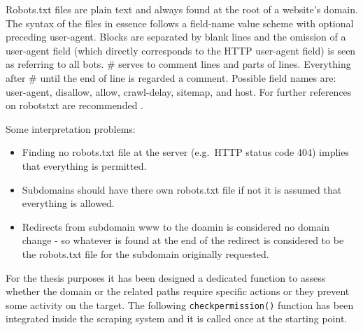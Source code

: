 \documentclass[
  12pt,
  a4paper,
  oneside]{book}
\newenvironment{Shaded}{\begin{snugshade}}{\end{snugshade}}
\newcommand{\CharTok}[1]{\textcolor[rgb]{0.31,0.60,0.02}{#1}}
\newcommand{\CommentTok}[1]{\textcolor[rgb]{0.56,0.35,0.01}{\textit{#1}}}
\newcommand{\ControlFlowTok}[1]{\textcolor[rgb]{0.13,0.29,0.53}{\textbf{#1}}}
\newcommand{\DataTypeTok}[1]{\textcolor[rgb]{0.13,0.29,0.53}{#1}}
\newcommand{\DecValTok}[1]{\textcolor[rgb]{0.00,0.00,0.81}{#1}}
\newcommand{\KeywordTok}[1]{\textcolor[rgb]{0.13,0.29,0.53}{\textbf{#1}}}
\newcommand{\NormalTok}[1]{#1}
\newcommand{\OperatorTok}[1]{\textcolor[rgb]{0.81,0.36,0.00}{\textbf{#1}}}
\newcommand{\StringTok}[1]{\textcolor[rgb]{0.31,0.60,0.02}{#1}}
\providecommand{\tightlist}{%
  \setlength{\itemsep}{0pt}\setlength{\parskip}{0pt}}
\theoremstyle{definition}
\theoremstyle{definition}
\theoremstyle{definition}
\theoremstyle{remark}
\begin{document}
Robots.txt files are plain text and always found at the root of a website's domain. The syntax of the files in essence follows a field-name value scheme with optional preceding user-agent. Blocks are separated by blank lines and the omission of a user-agent field (which directly corresponds to the HTTP user-agent field) is seen as referring to all bots. \# serves to comment lines and parts of lines. Everything after \# until the end of line is regarded a comment. Possible field names are: user-agent, disallow, allow, crawl-delay, sitemap, and host. For further references on robotstxt are recommended \citep[\citet{google:robottxt}]{robotstxt}.

Some interpretation problems:

\begin{itemize}
\tightlist
\item
  Finding no robots.txt file at the server (e.g.~HTTP status code 404) implies that everything is permitted.
\item
  Subdomains should have there own robots.txt file if not it is assumed that everything is allowed.
\item
  Redirects from subdomain www to the doamin is considered no domain change - so whatever is found at the end of the redirect is considered to be the robots.txt file for the subdomain originally requested.
\end{itemize}

For the thesis purposes it has been designed a dedicated function to assess whether the domain or the related paths require specific actions or they prevent some activity on the target. The following \texttt{checkpermission()} function has been integrated inside the scraping system and it is called once at the starting point.

\begin{Shaded}
\end{Shaded}
\end{document}
